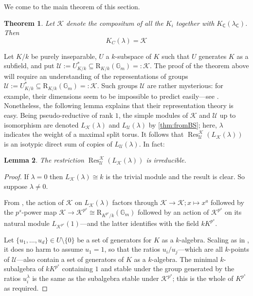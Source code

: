 \documentclass[11pt,reqno]{amsart}
\newtheorem{lemma}{Lemma}[subsection]
\newtheorem{theorem}[lemma]{Theorem}
\theoremstyle{definition}
\theoremstyle{remark}
\theoremstyle{definition}
\theoremstyle{plain}
\DeclareMathOperator{\Res}{Res}
\newcommand{\R}{\mathrm{R}}
\newcommand{\Gm}{\mathbb{G}_m}
\newcommand{\KK}{\mathcal{K}}
\newcommand{\Cs}{\mathsf{C}}
\begin{document}
We come to the main theorem of this section.
\begin{theorem}\label{fieldfromclass}
  Let $\KK$ denote the compositum of all the $K_i$ together with $K_\Cs(\lambda_\Cs)$. Then 
\begin{equation}K_C(\lambda)= \mathcal{K}\label{theequation}\end{equation} 
\end{theorem}

Let $K/k$ be purely inseparable, $U$ a $k$-subspace of $K$ such that $U$ generates $K$ as a subfield, and put $\mathscr{U}:=U^*_{K/k}\subseteq \R_{K/k}(\Gm)=:\mathscr{K}$. The proof of the theorem above will require an understanding of the representations of groups $\mathscr{U}:=U^*_{K/k}\subseteq \R_{K/k}(\Gm)=:\mathscr{K}$. Such groups $\mathscr{U}$ are rather mysterious: for example, their dimensions seem to be impossible to predict easily---see \cite[9.1.8--9.1.10]{CGP15}. Nonetheless, the following lemma explains that their representation theory is easy. Being pseudo-reductive of rank $1$, the simple modules of $\mathscr{K}$ and $\mathscr{U}$ up to isomorphism are denoted $L_\mathscr{K}(\lambda)$ and $L_\mathscr{U}(\lambda)$ by \cref{thm:fromBS}; here, $\lambda$ indicates the weight of a maximal split torus. It follows that $\Res^{\mathscr{K}}_\mathscr{U}(L_\mathscr{K}(\lambda))$ is an isotypic direct sum of copies of $L_\mathscr{U}(\lambda)$. In fact:
\begin{lemma}\label{theustaractsirred}
   The restriction $\Res^{\mathscr{K}}_\mathscr{U}(L_\mathscr{K}(\lambda))$ is irreducible.
\end{lemma}
\begin{proof}
  If $\lambda=0$ then $L_\mathscr{K}(\lambda)\cong k$ is the trivial module and the result is clear. So suppose $\lambda\neq 0$. 
  
From \cite[Thm.~5.8]{BS22}, the action of $\mathscr{K}$ on $L_\mathscr{K}(\lambda)$ factors through $\mathscr{K}\to \mathscr{K}; x\mapsto x^a$ followed by the $p^s$-power map $\mathscr{K}\to \mathscr{K}^{p^s}\cong \R_{K^{p^s}/k}(\Gm)$ followed by an action of $\mathscr{K}^{p^s}$ on its natural module $L_{\mathscr{K}^{p^s}}(1)$---and the latter identifies with the field $kK^{p^s}$.

Let $\{u_1,\dots,u_d\}\in U\setminus\{0\}$ be a set of generators for $K$ as a $k$-algebra. Scaling as in \cite[3.1.4, Proof]{CPClass}, it does no harm to assume $u_1=1$, so that the ratios $u_i/u_j$---which are all $k$-points of $\mathscr{U}$---also contain a set of generators of $K$ as a $k$-algebra. The minimal $k$-subalgebra of $kK^{p^s}$ containing $1$ and stable under the group generated by the ratios $u_i^\lambda$ is the same as the subalgebra stable under $\mathscr{K}^{p^s}$; this is the whole of $K^{p^s}$ as required.
\end{proof}
\end{document}
